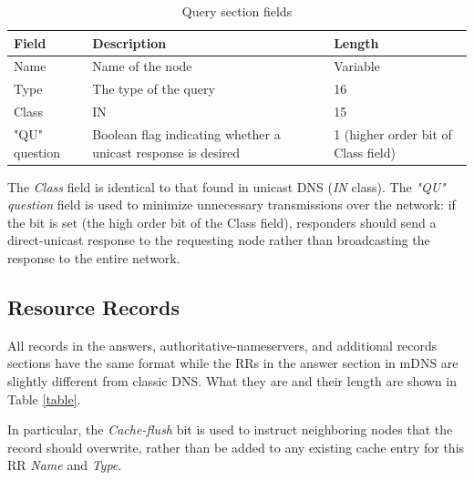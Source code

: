 \documentclass[fleqn, 11pt]{SelfArx} %
\begin{document}
\begin{table}[hbt]
	\centering
	\begin{tabular}{|C{2cm}|C{2.8cm}|C{1.5cm}|}
		\hline
		\textbf{Field} & \textbf{Description} & \textbf{Length} \\
		\hline
		\hline
		Name & Name of the node & Variable \\
		\hline
		Type & The type of the query & 16 \\
		\hline
		Class & IN & 15 \\
		\hline
		"QU" question & Boolean flag indicating whether a unicast response is desired & 1 (higher order bit of Class field)\\
		\hline
	\end{tabular}
	\caption{Query section fields}
	\label{tab:query-section}
\end{table}

The {\it{Class}} field is identical to that found in unicast DNS ({\it{IN}} class).
The {\it{"QU" question}} field is used to minimize unnecessary transmissions over the network: if the bit is set (the high order bit of the Class field), responders should send a direct-unicast response to the requesting node rather than broadcasting the response to the entire network.\newline

\subsection{Resource Records}
All records in the answers, authoritative-nameservers, and additional records sections have the same format while the RRs in the answer section in mDNS are slightly different from classic DNS. What they are and their length are shown in Table \ref{table}. \newline

In particular, the {\it{Cache-flush}} bit is used to instruct neighboring nodes that the record should overwrite, rather than be added to any existing cache entry for this RR {\it{Name}} and {\it{Type}}.
\end{document}
